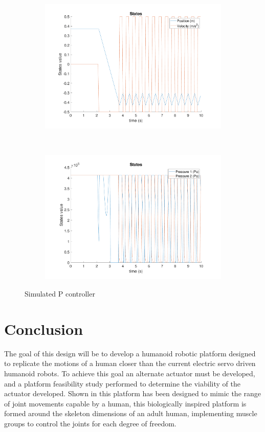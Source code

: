 \documentclass[11pt,a4paper]{article}
\begin{document}
\begin{figure}[!hbt]
\begin{subfigure}[t]{0.45\textwidth}
    \includegraphics[width=\textwidth]{figure11.pdf}
    \caption{}
    \end{subfigure}
    ~
    \begin{subfigure}[t]{0.45\textwidth}
    \centering
    \includegraphics[width=\textwidth]{figure12.pdf}
    \caption{}
    \end{subfigure}
        \caption{Simulated P controller}
    \label{fig:simulated_p_controller}
\end{figure}

\clearpage
\section{Conclusion}
\label{sec:conclusion}
The goal of this design  will be to develop a humanoid robotic platform designed to replicate the motions of a human closer than the current electric servo driven humanoid robots. To achieve this goal an alternate actuator must be developed, and a platform feasibility study performed to determine the viability of the actuator developed. Shown in  this platform has been designed to mimic the range of joint movements capable by a human, this biologically inspired platform is formed around the skeleton dimensions of an adult human, implementing muscle groups to control the joints for each degree of freedom. \newline
\end{document}
